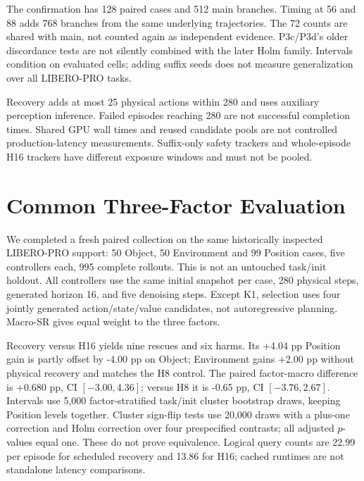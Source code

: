 \documentclass{article}
\begin{document}
The confirmation has 128 paired cases and 512 main branches.
Timing at 56 and 88 adds 768 branches from the same underlying trajectories.
The 72 counts are shared with main, not counted again as independent evidence.
P3c/P3d's older discordance tests are not silently combined with the later
Holm family. Intervals condition on evaluated cells; adding suffix seeds
does not measure generalization over all LIBERO-PRO tasks.

Recovery adds at most 25 physical actions within 280 and uses auxiliary
perception inference. Failed episodes reaching 280 are not successful
completion times. Shared GPU wall times and reused candidate pools are
not controlled production-latency measurements.
Suffix-only safety trackers and whole-episode H16 trackers have different
exposure windows and must not be pooled.

\section{Common Three-Factor Evaluation}
\label{app:broad}
We completed a fresh paired collection on the same historically inspected
LIBERO-PRO support: 50 Object, 50 Environment and 99 Position cases,
five controllers each, 995 complete rollouts. This is not an untouched
task/init holdout. All controllers use the same initial snapshot per case,
280 physical steps, generated horizon 16, and five denoising steps.
Except K1, selection uses four jointly generated action/state/value candidates,
not autoregressive planning. Macro-SR gives equal weight to the three factors.

\begin{table}[ht]
\caption{Completed corrected-runtime v2 evaluation. Factor entries and macro-SR are
percentages; Success counts all 199 cases. Scheduled recovery does not
establish significant aggregate improvement over H16.}
\label{tab:broad}
\centering\small
\end{table}

Recovery versus H16 yields nine rescues and six harms. Its +4.04 pp
Position gain is partly offset by -4.00 pp on Object; Environment gains
+2.00 pp without physical recovery and matches the H8 control.
The paired factor-macro difference is +0.680 pp, CI $[-3.00,4.36]$;
versus H8 it is -0.65 pp, CI $[-3.76,2.67]$.
Intervals use 5,000 factor-stratified task/init cluster bootstrap draws,
keeping Position levels together. Cluster sign-flip tests use 20,000 draws
with a plus-one correction and Holm correction over four prespecified
contrasts; all adjusted $p$-values equal one. These do not prove equivalence.
Logical query counts are 22.99 per episode for scheduled recovery and
13.86 for H16; cached runtimes are not standalone latency comparisons.
\end{document}
